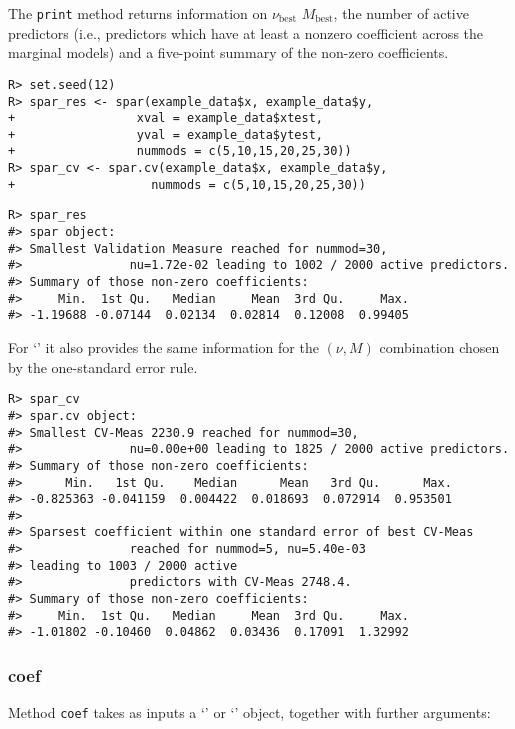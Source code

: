 \documentclass[
  article,
  nojss]{jss}
\newcommand{\class}[1]{`\code{#1}'}
\begin{document}
The \texttt{print} method returns information on \(\nu_\text{best}\)
\(M_\text{best}\), the number of active predictors (i.e., predictors
which have at least a nonzero coefficient across the marginal models)
and a five-point summary of the non-zero coefficients.

\begin{verbatim}
R> set.seed(12)
R> spar_res <- spar(example_data$x, example_data$y,
+                 xval = example_data$xtest,
+                 yval = example_data$ytest,
+                 nummods = c(5,10,15,20,25,30))
R> spar_cv <- spar.cv(example_data$x, example_data$y,
+                   nummods = c(5,10,15,20,25,30))
\end{verbatim}

\begin{verbatim}
R> spar_res
#> spar object:
#> Smallest Validation Measure reached for nummod=30,
#>               nu=1.72e-02 leading to 1002 / 2000 active predictors.
#> Summary of those non-zero coefficients:
#>     Min.  1st Qu.   Median     Mean  3rd Qu.     Max. 
#> -1.19688 -0.07144  0.02134  0.02814  0.12008  0.99405
\end{verbatim}

For \class{spar.cv} it also provides the same information for the
\((\nu, M)\) combination chosen by the one-standard error rule.

\begin{verbatim}
R> spar_cv
#> spar.cv object:
#> Smallest CV-Meas 2230.9 reached for nummod=30,
#>               nu=0.00e+00 leading to 1825 / 2000 active predictors.
#> Summary of those non-zero coefficients:
#>      Min.   1st Qu.    Median      Mean   3rd Qu.      Max. 
#> -0.825363 -0.041159  0.004422  0.018693  0.072914  0.953501 
#> 
#> Sparsest coefficient within one standard error of best CV-Meas
#>               reached for nummod=5, nu=5.40e-03 
#> leading to 1003 / 2000 active
#>               predictors with CV-Meas 2748.4.
#> Summary of those non-zero coefficients:
#>     Min.  1st Qu.   Median     Mean  3rd Qu.     Max. 
#> -1.01802 -0.10460  0.04862  0.03436  0.17091  1.32992
\end{verbatim}

\subsubsection{coef}\label{coef}

Method \texttt{coef} takes as inputs a \class{spar} or \class{spar.cv}
object, together with further arguments:
\end{document}

